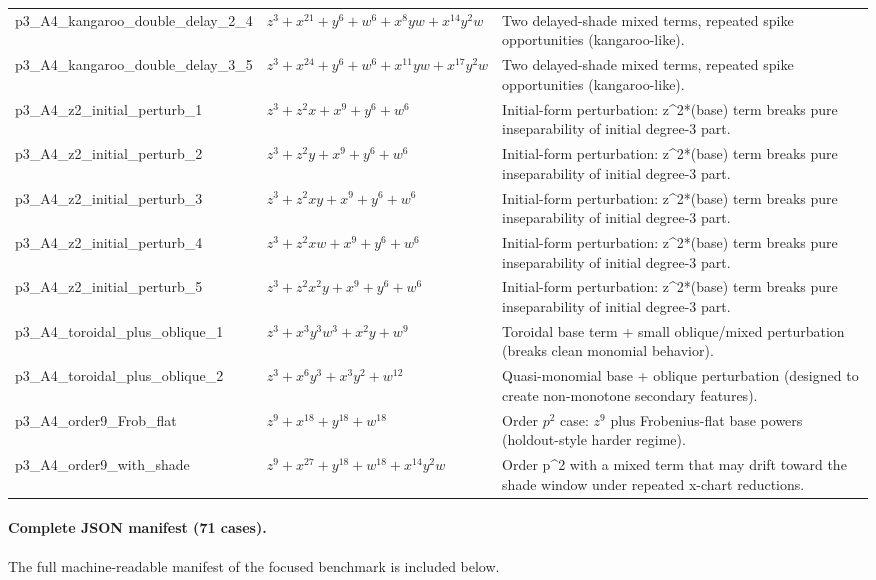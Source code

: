 \documentclass[11pt]{amsart}
\begin{document}
\begin{longtable}{@{}p{} p{} p{}@{}}
p3\_A4\_kangaroo\_double\_delay\_2\_4 & $z^{3} + x^{21} + y^{6} + w^{6} + x^{8}yw + x^{14}y^{2}w$ & Two delayed-shade mixed terms, repeated spike opportunities (kangaroo-like). \\
p3\_A4\_kangaroo\_double\_delay\_3\_5 & $z^{3} + x^{24} + y^{6} + w^{6} + x^{11}yw + x^{17}y^{2}w$ & Two delayed-shade mixed terms, repeated spike opportunities (kangaroo-like). \\
p3\_A4\_z2\_initial\_perturb\_1 & $z^{3} + z^{2}x + x^{9} + y^{6} + w^{6}$ & Initial-form perturbation: z\textasciicircum{}2*(base) term breaks pure inseparability of initial degree-3 part. \\
p3\_A4\_z2\_initial\_perturb\_2 & $z^{3} + z^{2}y + x^{9} + y^{6} + w^{6}$ & Initial-form perturbation: z\textasciicircum{}2*(base) term breaks pure inseparability of initial degree-3 part. \\
p3\_A4\_z2\_initial\_perturb\_3 & $z^{3} + z^{2}xy + x^{9} + y^{6} + w^{6}$ & Initial-form perturbation: z\textasciicircum{}2*(base) term breaks pure inseparability of initial degree-3 part. \\
p3\_A4\_z2\_initial\_perturb\_4 & $z^{3} + z^{2}xw + x^{9} + y^{6} + w^{6}$ & Initial-form perturbation: z\textasciicircum{}2*(base) term breaks pure inseparability of initial degree-3 part. \\
p3\_A4\_z2\_initial\_perturb\_5 & $z^{3} + z^{2}x^{2}y + x^{9} + y^{6} + w^{6}$ & Initial-form perturbation: z\textasciicircum{}2*(base) term breaks pure inseparability of initial degree-3 part. \\
p3\_A4\_toroidal\_plus\_oblique\_1 & $z^{3} + x^{3}y^{3}w^{3} + x^{2}y + w^{9}$ & Toroidal base term + small oblique/mixed perturbation (breaks clean monomial behavior). \\
p3\_A4\_toroidal\_plus\_oblique\_2 & $z^{3} + x^{6}y^{3} + x^{3}y^{2} + w^{12}$ & Quasi-monomial base + oblique perturbation (designed to create non-monotone secondary features). \\
p3\_A4\_order9\_Frob\_flat & $z^{9} + x^{18} + y^{18} + w^{18}$ & Order $p^2$ case: $z^9$ plus Frobenius-flat base powers (holdout-style harder regime). \\
p3\_A4\_order9\_with\_shade & $z^{9} + x^{27} + y^{18} + w^{18} + x^{14}y^{2}w$ & Order p\textasciicircum{}2 with a mixed term that may drift toward the shade window under repeated x-chart reductions. \\
\bottomrule
\end{longtable}

\paragraph{Complete JSON manifest (71 cases).}
The full machine-readable manifest of the focused benchmark is included below.
\end{document}
